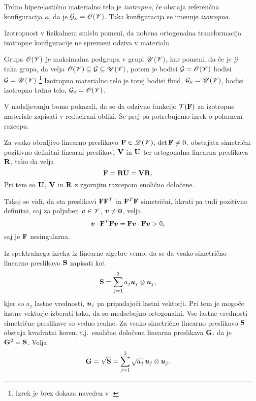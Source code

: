 \begin{definicija}
	Trdno hiperelastično materialno telo je \emph{izotropno}, če obstaja referenčna
	konfiguracija $\kappa$, da je $\mathcal{G}_{\kappa}=\mathscr{O}(\mathscr V)$. Taka konfiguracija
	se imenuje \emph{izotropna}.
\end{definicija}

Izotropnost v fizikalnem smislu pomeni, da nobena ortogonalna transformacija izotropne
konfiguracije ne spremeni odziva v materialu.

Grupa $\mathscr{O}(\mathscr V)$ je maksimalna podgrupa v grupi $\mathscr{U}(\mathscr V)$, kar pomeni,
da če je $\mathcal{G}$ taka grupa, da velja $\mathscr{O}(\mathscr V)\subseteq\mathcal{G}\subseteq\mathscr{U}(\mathscr V)$,
potem je bodisi $\mathcal{G}=\mathscr{O}(\mathscr V)$ bodisi $\mathcal{G}=\mathscr{U}(\mathscr V)$.\footnote{
Izrek je brez dokaza naveden v \cite[str.~88]{liu}.}
Izotropno materialno telo je torej bodisi fluid, $\mathcal{G}_{\kappa}=\mathscr{U}(\mathscr V)$,
bodisi izotropno trdno telo, $\mathcal{G}_{\kappa}=\mathscr{O}(\mathscr V)$.

V nadaljevanju bomo pokazali, da se da odzivno funkcijo $\mathcal{T}(\mathbf F)$ za izotropne materiale
zapisati v reducirani obliki. Še prej pa potrebujemo izrek o polarnem razcepu.

\begin{izrek}
	Za vsako obrnljivo linearno preslikavo $\mathbf F\in\mathscr L(\mathscr V)$, $\det\mathbf F\neq 0$,
	obstajata simetrični pozitivno definitni linearni preslikavi $\mathbf V$ in $\mathbf U$
	ter ortogonalna linearna preslikava $\mathbf R$, tako da velja
	\[
		\mathbf F=\mathbf R\mathbf U=\mathbf V\mathbf R.
	\]
	Pri tem so $\mathbf U$, $\mathbf V$ in $\mathbf R$ z zgornjim razcepom enolično določene.
\end{izrek}

\proof
	Takoj se vidi, da sta preslikavi $\mathbf F\mathbf F^T$ in $\mathbf F^T\mathbf F$
	simetrični, hkrati pa tudi pozitivno definitni, saj za poljuben $\boldsymbol v\in\mathscr V$,
	$\boldsymbol v\neq\boldsymbol 0$, velja
	\[ \boldsymbol v\cdot\mathbf F^T\mathbf F\boldsymbol v=\mathbf F\boldsymbol v\cdot\mathbf F\boldsymbol v>0, \]
	saj je $\mathbf F$ nesingularna.
	
	Iz spektralnega izreka iz linearne algebre vemo, da se da vsako simetrično
	linearno preslikavo $\mathbf S$ zapisati kot
	\[ \mathbf S=\sum_{j=1}^3 a_j\boldsymbol u_j\otimes\boldsymbol u_j, \]
	kjer so $a_j$ lastne vrednosti, $\boldsymbol u_j$ pa pripadajoči lastni vektorji.
	Pri tem je mogoče lastne vektorje izberati tako, da so medsebojno ortogonalni.
	Vse lastne vrednosti simetrične preslikave so vedno realne. Za vsako
	simetrično linearno preslikavo $\mathbf S$ obstaja kvadratni koren, t.j.~enolično določena linearna
	preslikava $\mathbf G$, da je $\mathbf G^2=\mathbf S$. Velja
	\[ \mathbf G=\sqrt{\mathbf S}=\sum_{j=1}^3 \sqrt{a_j}\,\boldsymbol u_j\otimes\boldsymbol u_j. \]
	
